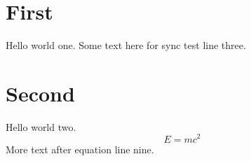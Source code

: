 \documentclass{article}
\begin{document}
\section{First}
Hello world one. \label{sec:first}
Some text here for sync test line three.
\section{Second}
Hello world two.
\begin{equation}
E = mc^2 \label{eq:e}
\end{equation}
More text after equation line nine.
\end{document}

